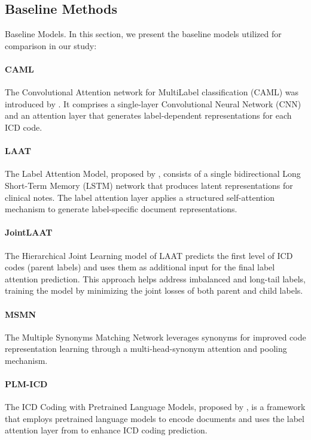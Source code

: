 \documentclass[11pt]{article}
\begin{document}
\subsection{Baseline Methods}
Baseline Models. In this section, we present the baseline models utilized for comparison in our study:

\paragraph{CAML} The Convolutional Attention network for MultiLabel classification (CAML) was introduced by \citet{mullenbach-etal-2018-explainable}. It comprises a single-layer Convolutional Neural Network (CNN) and an attention layer that generates label-dependent representations for each ICD code.

\paragraph{LAAT} The Label Attention Model, proposed by \citet{ijcai2020-461-vu}, consists of a single bidirectional Long Short-Term Memory (LSTM) network that produces latent representations for clinical notes. The label attention layer applies a structured self-attention mechanism to generate label-specific document representations.

\paragraph{JointLAAT} The Hierarchical Joint Learning model of LAAT predicts the first level of ICD codes (parent labels) and uses them as additional input for the final label attention prediction. This approach helps address imbalanced and long-tail labels, training the model by minimizing the joint losses of both parent and child labels.

\paragraph{MSMN} The Multiple Synonyms Matching Network \citep{yuan-etal-2022-code} leverages synonyms for improved code representation learning through a multi-head-synonym attention and pooling mechanism.

\paragraph{PLM-ICD} The ICD Coding with Pretrained Language Models, proposed by \citet{huang-etal-2022-plm}, is a framework that employs pretrained language models to encode documents and uses the label attention layer from \citet{ijcai2020-461-vu} to enhance ICD coding prediction.
\end{document}
